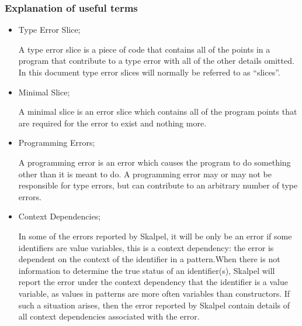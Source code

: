 \documentclass{report}
\begin{document}
\subsubsection{Explanation of useful terms}
\begin{itemize}


\item Type Error Slice;

  \subitem A type error slice is a piece of code that contains all of
  the points in a program that contribute to a type error with all of
  the other details omitted. In this document type error slices will
  normally be referred to as ``slices''.



\item Minimal Slice;

  \subitem A minimal slice is an error slice which contains all of the
  program points that are required for the error to exist and nothing
  more.



\item Programming Errors;

  \subitem A programming error is an error which causes the program to
  do something other than it is meant to do. A programming error may
  or may not be responsible for type errors, but can contribute to an
  arbitrary number of type errors.


\item Context Dependencies;

  \subitem In some of the errors reported by Skalpel, it
  will be only be an error if some identifiers are value variables,
  this is a context dependency: the error is dependent on the context
  of the identifier in a pattern.When there is not information to
  determine the true status of an identifier(s), Skalpel
  will report the error under the context dependency that the
  identifier is a value variable, as values in patterns are more often
  variables than constructors. If such a situation arises, then the
  error reported by Skalpel contain details of all
  context dependencies associated with the error.



\end{itemize}
\end{document}
